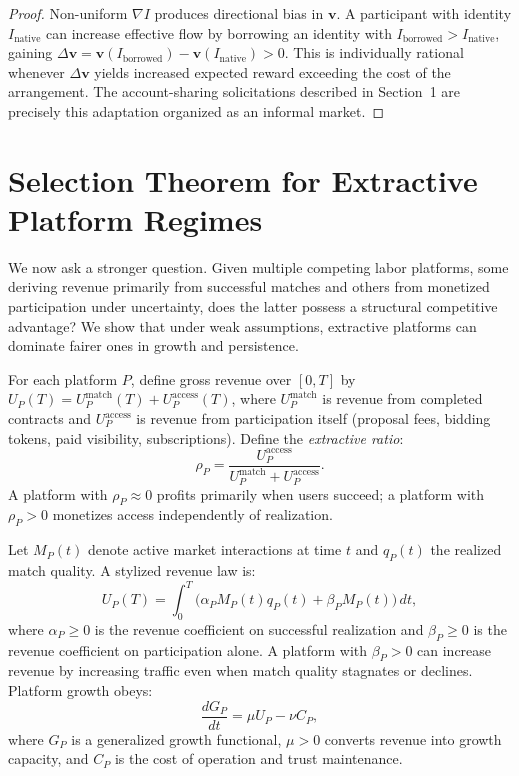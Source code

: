 \documentclass[11pt]{article}
\begin{document}
\begin{proof}
Non-uniform $\nabla I$ produces directional bias in $\mathbf{v}$. A
participant with identity $I_{\text{native}}$ can increase effective flow by
borrowing an identity with $I_{\text{borrowed}} > I_{\text{native}}$, gaining
$\Delta\mathbf{v} = \mathbf{v}(I_{\text{borrowed}}) - \mathbf{v}(I_{\text{native}})
> 0$. This is individually rational whenever $\Delta\mathbf{v}$ yields
increased expected reward exceeding the cost of the arrangement. The
account-sharing solicitations described in Section~1 are precisely this
adaptation organized as an informal market.
\end{proof}

\section{Selection Theorem for Extractive Platform Regimes}
\label{sec:selection}

We now ask a stronger question. Given multiple competing labor platforms,
some deriving revenue primarily from successful matches and others from
monetized participation under uncertainty, does the latter possess a
structural competitive advantage? We show that under weak assumptions,
extractive platforms can dominate fairer ones in growth and persistence.

For each platform $P$, define gross revenue over $[0,T]$ by
$U_P(T) = U_P^{\mathrm{match}}(T) + U_P^{\mathrm{access}}(T)$,
where $U_P^{\mathrm{match}}$ is revenue from completed contracts and
$U_P^{\mathrm{access}}$ is revenue from participation itself (proposal fees,
bidding tokens, paid visibility, subscriptions). Define the
\emph{extractive ratio}:
\[
\rho_P = \frac{U_P^{\mathrm{access}}}{U_P^{\mathrm{match}} +
U_P^{\mathrm{access}}}.
\]
A platform with $\rho_P \approx 0$ profits primarily when users succeed;
a platform with $\rho_P > 0$ monetizes access independently of realization.

Let $M_P(t)$ denote active market interactions at time $t$ and $q_P(t)$
the realized match quality. A stylized revenue law is:
\[
U_P(T) = \int_0^T \bigl( \alpha_P M_P(t) q_P(t) + \beta_P M_P(t)
\bigr)\,dt,
\]
where $\alpha_P \geq 0$ is the revenue coefficient on successful realization
and $\beta_P \geq 0$ is the revenue coefficient on participation alone. A
platform with $\beta_P > 0$ can increase revenue by increasing traffic even
when match quality stagnates or declines. Platform growth obeys:
\[
\frac{dG_P}{dt} = \mu U_P - \nu C_P,
\]
where $G_P$ is a generalized growth functional, $\mu > 0$ converts revenue
into growth capacity, and $C_P$ is the cost of operation and trust
maintenance.
\end{document}

